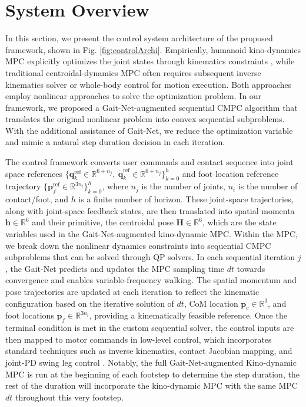 \section{System Overview}
\label{sec:overview}

In this section, we present the control system architecture of the proposed framework, shown in Fig. \ref{fig:controlArchi}. 
Empirically, humanoid kino-dynamics MPC explicitly optimizes the joint states through kinematics constraints \cite{gu2025humanoid}, while traditional centroidal-dynamics MPC often requires subsequent inverse kinematics solver or whole-body control for motion execution. Both approaches employ nonlinear approaches to solve the optimization problem. In our framework, we proposed a Gait-Net-augmented sequential CMPC algorithm that translates the original nonlinear problem into convex sequential subproblems. With the additional assistance of Gait-Net, we reduce the optimization variable and mimic a natural step duration decision in each iteration. 

The control framework converts user commands and contact sequence into joint space references $\{\mathbf q_k^\text{ref} \in \mathbb R^{6+n_j},\: \dot{\mathbf q}_k^\text{ref} \in \mathbb R^{6+n_j}\}^h_{k = 0}$ and foot location reference trajectory $\{\bm p_f^\text{ref}\in \mathbb R^{3n_i}\}^h_{k = 0}$, where $n_j$ is the number of joints, $n_i$ is the number of contact/foot, and $h$ is a finite number of horizon. These joint-space trajectories, along with joint-space feedback states, are then translated into spatial momenta $\bm h\in \mathbb R^6$ and their primitive, the centroidal pose $\bm H\in \mathbb R^6$, which are the state variables used in the Gait-Net-augmented kino-dynamic MPC. Within the MPC, we break down the nonlinear dynamics constraints into sequential CMPC subproblems that can be solved through QP solvers. In each sequential iteration $j$, the Gait-Net predicts and updates the MPC sampling time $dt$ towards convergence and enables variable-frequency walking.
The spatial momentum and pose trajectories are updated at each iteration to reflect the kinematic configuration based on the iterative solution of $dt$, CoM location $\bm p_c \in \mathbb R^3$, and foot locations $\bm p_f\in \mathbb R^{3n_i}$,
providing a kinematically feasible reference. Once the terminal condition is met in the custom sequential solver, the control inputs are then mapped to motor commands in low-level control, which incorporates standard techniques such as inverse kinematics, contact Jacobian mapping, and joint-PD swing leg control \cite{di2018dynamic}. Notably, the full Gait-Net-augmented Kino-dynamic MPC is run at the beginning of each footstep to determine the step duration, the rest of the duration will incorporate the kino-dynamic MPC with the same MPC $dt$ throughout this very footstep. 


 
